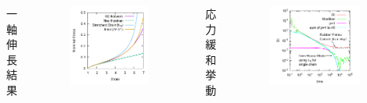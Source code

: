 \documentclass[11pt, dvipdfmx]{beamer}
\begin{document}
\begin{frame}
\begin{columns}[totalwidth=1\textwidth]
\scriptsize
一軸伸長結果
\vspace{-2mm}
\begin{figure}
\centering
\includegraphics[width=0.9\textwidth]{./fig/SS_Kuhn.pdf}
\end{figure}
\scriptsize
応力緩和挙動
\vspace{-2mm}
\begin{figure}
\centering
\includegraphics[width=0.9\textwidth]{./fig/Gt_loglog.pdf}

\end{figure}
\end{columns}
\end{frame}
\end{document}
